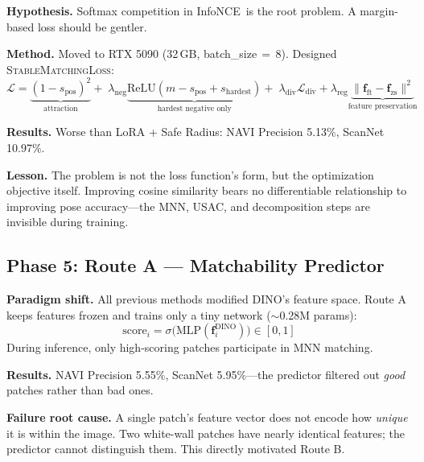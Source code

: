 \documentclass[11pt,a4paper]{article}
\newcommand{\infonce}{InfoNCE\ }
\newcommand{\methodname}[1]{\textsc{#1}}
\begin{document}
\textbf{Hypothesis.} Softmax competition in \infonce is the root problem. A margin-based loss should be gentler.

\textbf{Method.} Moved to RTX 5090 (32\,GB, batch\_size\,$=$\,8). Designed \methodname{StableMatchingLoss}:
\begin{equation}
\mathcal{L} = \underbrace{(1-s_{\text{pos}})^2}_{\text{attraction}} +\; \lambda_{\text{neg}}\underbrace{\text{ReLU}(m - s_{\text{pos}} + s_{\text{hardest}})}_{\text{hardest negative only}} +\; \lambda_{\text{div}}\mathcal{L}_{\text{div}} + \lambda_{\text{reg}}\underbrace{\|\mathbf{f}_{\text{ft}} - \mathbf{f}_{\text{zs}}\|^2}_{\text{feature preservation}}
\end{equation}

\textbf{Results.} Worse than LoRA + Safe Radius: NAVI Precision 5.13\%, ScanNet 10.97\%.

\textbf{Lesson.} The problem is not the loss function's form, but the optimization objective itself. Improving cosine similarity bears no differentiable relationship to improving pose accuracy---the MNN, USAC, and decomposition steps are invisible during training.

\begin{center}
\end{center}

\subsection{Phase 5: Route A --- Matchability Predictor}

\textbf{Paradigm shift.} All previous methods modified DINO's feature space. Route A keeps features frozen and trains only a tiny network ($\sim$0.28M params):
\begin{equation}
\text{score}_i = \sigma\bigl(\text{MLP}(\mathbf{f}_i^{\text{DINO}})\bigr) \in [0, 1]
\end{equation}
During inference, only high-scoring patches participate in MNN matching.

\textbf{Results.} NAVI Precision 5.55\%, ScanNet 5.95\%---the predictor filtered out \emph{good} patches rather than bad ones.

\textbf{Failure root cause.} A single patch's feature vector does not encode how \emph{unique} it is within the image. Two white-wall patches have nearly identical features; the predictor cannot distinguish them. This directly motivated Route B.
\end{document}
